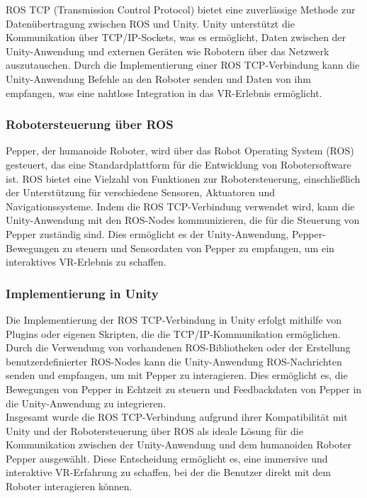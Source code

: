 ROS TCP (Transmission Control Protocol) bietet eine zuverlässige Methode zur Datenübertragung zwischen ROS und Unity. Unity unterstützt die Kommunikation über TCP/IP-Sockets, was es ermöglicht, Daten zwischen der Unity-Anwendung und externen Geräten wie Robotern über das Netzwerk auszutauschen. Durch die Implementierung einer ROS TCP-Verbindung kann die Unity-Anwendung Befehle an den Roboter senden und Daten von ihm empfangen, was eine nahtlose Integration in das VR-Erlebnis ermöglicht.

\subsubsection{Robotersteuerung über ROS}

Pepper, der humanoide Roboter, wird über das Robot Operating System (ROS) gesteuert, das eine Standardplattform für die Entwicklung von Robotersoftware ist. ROS bietet eine Vielzahl von Funktionen zur Robotersteuerung, einschließlich der Unterstützung für verschiedene Sensoren, Aktuatoren und Navigationssysteme. Indem die ROS TCP-Verbindung verwendet wird, kann die Unity-Anwendung mit den ROS-Nodes kommunizieren, die für die Steuerung von Pepper zuständig sind. Dies ermöglicht es der Unity-Anwendung, Pepper-Bewegungen zu steuern und Sensordaten von Pepper zu empfangen, um ein interaktives VR-Erlebnis zu schaffen.

\subsubsection{Implementierung in Unity}

Die Implementierung der ROS TCP-Verbindung in Unity erfolgt mithilfe von Plugins oder eigenen Skripten, die die TCP/IP-Kommunikation ermöglichen. Durch die Verwendung von vorhandenen ROS-Bibliotheken oder der Erstellung benutzerdefinierter ROS-Nodes kann die Unity-Anwendung ROS-Nachrichten senden und empfangen, um mit Pepper zu interagieren. Dies ermöglicht es, die Bewegungen von Pepper in Echtzeit zu steuern und Feedbackdaten von Pepper in die Unity-Anwendung zu integrieren.
\\

\noindent
Insgesamt wurde die ROS TCP-Verbindung aufgrund ihrer Kompatibilität mit Unity und der Robotersteuerung über ROS als ideale Lösung für die Kommunikation zwischen der Unity-Anwendung und dem humanoiden Roboter Pepper ausgewählt. Diese Entscheidung ermöglicht es, eine immersive und interaktive VR-Erfahrung zu schaffen, bei der die Benutzer direkt mit dem Roboter interagieren können.